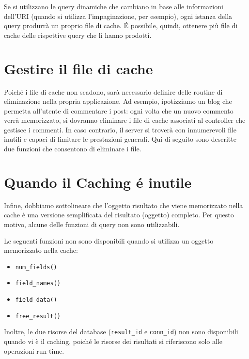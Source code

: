 Se si utilizzano le query dinamiche che cambiano in base alle informazioni dell'\ac{URI} (quando si utilizza l'impaginazione, per esempio), ogni istanza della query produrrà un proprio file di cache. \'E possibile, quindi, ottenere più file di cache delle rispettive query che li hanno prodotti.

\section*{Gestire il file di cache}
Poiché i file di cache non scadono, sarà necessario definire delle routine di eliminazione nella propria applicazione. Ad esempio, ipotizziamo un blog che permetta all'utente di commentare i post: ogni volta che un nuovo commento verrà memorizzato, si dovranno eliminare i file di cache associati al controller che gestisce i commenti. In caso contrario, il server si troverà con innumerevoli file inutili e capaci di limitare le prestazioni generali. Qui di seguito sono descritte due funzioni che consentono di eliminare i file.

\section*{Quando il Caching \'e inutile}
Infine, dobbiamo sottolineare che l'oggetto risultato che viene memorizzato nella cache è una versione semplificata del risultato (oggetto) completo. Per questo motivo, alcune delle funzioni di query non sono utilizzabili.

Le seguenti funzioni non sono disponibili quando si utilizza un oggetto memorizzato nella cache:

\begin{itemize}
\item \verb|num_fields()| 
\item \verb|field_names()| 
\item \verb|field_data()| 
\item \verb|free_result()| 
\end{itemize}

Inoltre, le due risorse del database (\verb|result_id| e \verb|conn_id|) non sono disponibili quando vi è il caching, poiché le risorse dei risultati si riferiscono solo alle operazioni run-time.

